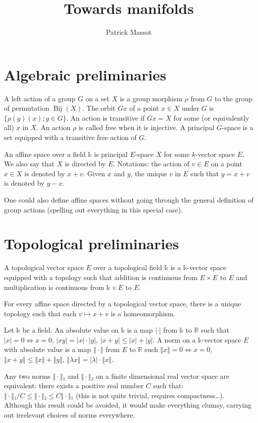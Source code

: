 \documentclass{article}
\title{Towards manifolds}
\author{Patrick Massot}
\DeclareMathOperator{\Bij}{Bij}
\renewcommand{\k}{\mathbb{k}}
\begin{document}
\maketitle

\section{Algebraic preliminaries}
\label{sec:algebraic_preliminaries}

A left action of a group $G$ on a set $X$ is a group morphism $ρ$ from $G$
to the group of permutation $\Bij(X)$. The orbit $Gx$ of a point $x ∈ X$
under $G$ is $\{ ρ(g)(x); g ∈ G\}$. An action is transitive if 
$Gx = X$ for some (or equivalently all) $x$ in $X$. An action $ρ$ is
called free when it is injective. A principal $G$-space is a set
equipped with a transitive free action of $G$.

An affine space over a field $\k$ is principal $E$-space $X$ for some
$k$-vector space $E$. We also say that $X$ is directed by $E$.
Notations: the action of $v ∈ E$ on a point 
$x ∈ X$ is denoted by $x + v$. Given $x$ and $y$, the unique $v$ in $E$
such that $y = x + v$ is denoted by $y - x$.

One could also define affine spaces without going through the general
definition of group actions (spelling out everything in this special
case).

\section{Topological preliminaries}
\label{sec:topological_preliminaries}

A topological vector space $E$ over a topological field $\k$ is a
$\k$-vector space equipped with a topology such that addition is
continuous from $E × E$ to $E$ and multiplication is continuous from 
$\k × E$ to $E$.

For every affine space directed by a topological vector space, there is
a unique topology such that each $v ↦ x + v$ is a homeomorphism.

Let $\k$ be a field. An absolute value on $\k$ is a map $|·|$ from 
$\k$ to $ℝ$ such that $|x| = 0 ⇔ x = 0$, $|xy|= |x|·|y|$, 
$|x + y| ≤ |x| + |y|$.
A norm on a $\k$-vector space $E$ with absolute value is a map $‖·‖$
from $E$ to $ℝ$ such $‖x‖ = 0 ⇔ x = 0$, $‖x + y‖ ≤ ‖x‖ + ‖y‖$, 
$‖λ x‖ =|λ| · ‖x‖$.

Any two norms $‖·‖₁$ and $‖·‖₂$ on a finite dimensional real
vector space are equivalent: there exists a positive real number $C$
such that: $‖·‖₁/C ≤ ‖·‖₂ ≤ C‖·‖₁$ (this is not quite trivial, requires
compactness…). Although this result could be avoided, it would make
everything clumsy, carrying out irrelevant choices of norms everywhere.
\end{document}
